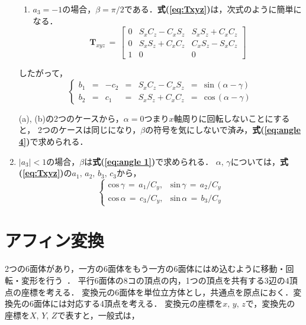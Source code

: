 \begin{enumerate}
\begin{enumerate}
\item $a_3=-1$の場合，$\beta=\pi/2$である．\textbf{式(\ref{eq:Txyz})}は，次式のように簡単になる．
\begin{equation}
{\bm T}_{xyz} \,=\,
\left[
\begin{array}{ccc}
0 & S_x C_z - C_x S_z & S_x S_z + C_x C_z\\
0 & S_x S_z + C_x C_z & C_x S_z - S_x C_z\\
1 & 0 & 0
\end{array}
\right]
\label{eq:Txyz=-1}
\end{equation}
\end{enumerate}

したがって，
\begin{equation}
\left\{
\begin{array}{lllllll}
b_1 & = & -c_2 & = & S_x C_z - C_x S_z & = & \mathrm{sin}\,(\alpha-\gamma)\\
b_2 & = & c_1  & = & S_x S_z + C_x C_z & = & \mathrm{cos}\,(\alpha-\gamma)
\end{array}
\right.
\label{eq:angle 3}
\end{equation}

(a), (b)の2つのケースから，$\alpha=0$つまり$x$軸周りに回転しないことにすると，
2つのケースは同じになり，$\beta$の符号を気にしないで済み，\textbf{式(\ref{eq:angle 4})}で求められる．

\vspace{2mm}

\item $|a_3|<1$の場合，$\beta$は\textbf{式(\ref{eq:angle 1})}で求められる．
$\alpha,\,\gamma$については，\textbf{式(\ref{eq:Txyz})}の$a_1,\,a_2,\,b_3,\,c_3$から，
\begin{equation}
\left\{
\begin{array}{lllllll}
\mathrm{cos}\,\gamma \,=\, a_1/C_y, & \mathrm{sin}\,\gamma \,=\, a_2/C_y\\
\mathrm{cos}\,\alpha \,=\, c_3/C_y, & \mathrm{sin}\,\alpha \,=\, b_3/C_y
\end{array}
\right.
\label{eq:angle 4}
\end{equation}

\end{enumerate}


\hypertarget{tgt:affin}{\section{アフィン変換}}
2つの6面体があり，一方の6面体をもう一方の6面体にはめ込むように移動・回転・変形を行う~\cite{shimada:00:cadcg}．
平行6面体の8コの頂点の内，1つの頂点を共有する3辺の4頂点の座標を考える．
変換元の6面体を単位立方体とし，共通点を原点におく．変換先の6面体には対応する4頂点を考える．
変換元の座標を$x,\,y,\,z$で，変換先の座標を$X,\,Y,\,Z$で表すと，一般式は，


